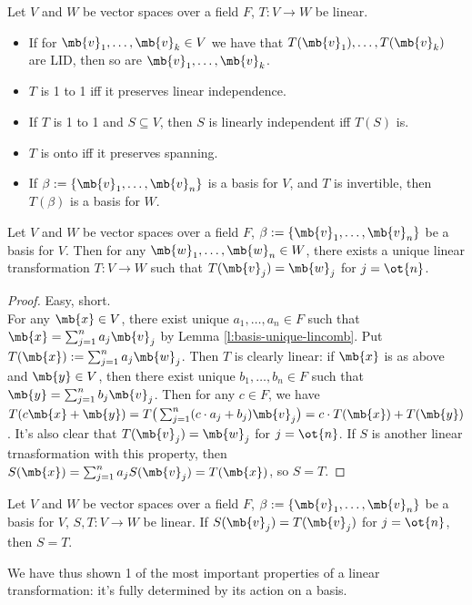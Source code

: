 \begin{exer}\label{e:1to1-preserve-LID}
Let $V$ and $W$ be vector spaces over a field $F$, $T:V \to W$ be linear.
\begin{itemize}
\item If for $\mb{v}_1, \ldots, \mb{v}_k \in V$ we have that $T(\mb{v}_1), \ldots,T(\mb{v}_k)$ are LID, then so are $\mb{v}_1, \ldots, \mb{v}_k$.
\item $T$ is 1 to 1 iff it preserves linear independence.
\item If $T$ is 1 to 1 and $S \subseteq V$, then $S$ is linearly independent iff $T(S)$ is.
\item $T$ is onto iff it preserves spanning.
\item If $\beta:= \{ \mb{v}_1, \ldots, \mb{v}_n \}$ is a basis for $V$, and $T$ is invertible, then $T( \beta)$ is a basis for $W$. 
\end{itemize}
\end{exer}
\begin{lem}\label{l:lin-map-basis}
Let $V$ and $W$ be vector spaces over a field $F$, $\beta:= \{ \mb{v}_1, \ldots, \mb{v}_n \}$ be a basis for $V$. Then for any $\mb{w}_1, \ldots, \mb{w}_n \in W$, there exists a unique linear transformation $T: V \to W$ such that $T( \mb{v}_j)= \mb{w}_j$ for $j=\ot{n}$.
\end{lem}
\begin{proof}
Easy, short.\\
For any $\mb{x}\in V$, there exist unique $a_1, \ldots,a_n \in F$ such that $\mb{x}= \sum_{j=1}^na_j \mb{v}_j$ by Lemma \ref{l:basis-unique-lincomb}. Put $T( \mb{x}):= \sum_{j=1}^na_j \mb{w}_j$.
Then $T$ is clearly linear: if $\mb{x}$ is as above and $\mb{y}\in V$, then there exist unique $b_1, \ldots,b_n \in F$ such that $\mb{y}= \sum_{j=1}^nb_j \mb{v}_j$. Then for any $c \in F$, we have $T(c \mb{x}+ \mb{y})=T \big( \sum_{j=1}^n(c \cdot a_j+b_j) \mb{v}_j \big)=c \cdot T( \mb{x})+T( \mb{y})$.
It's also clear that $T( \mb{v}_j)= \mb{w}_j$ for $j=\ot{n}$. If $S$ is another linear trnasformation with this property, then $S( \mb{x})= \sum_{j=1}^na_jS( \mb{v}_j)=T( \mb{x})$, so $S=T$.
\end{proof}
\begin{corollary}\label{c:lin-map-basis}
Let $V$ and $W$ be vector spaces over a field $F$, $\beta:= \{ \mb{v}_1, \ldots, \mb{v}_n \}$ be a basis for $V$, $S,T:V \to W$ be linear. If $S( \mb{v}_j)=T( \mb{v}_j)$ for $j=\ot{n}$, then $S=T$.
\end{corollary}
We have thus shown 1 of the most important properties of a linear transformation: it's fully determined by its action on a basis.

